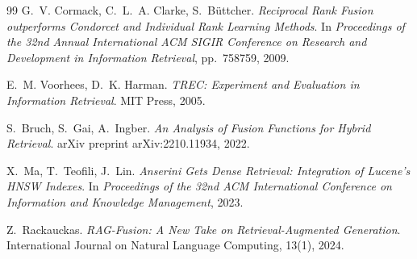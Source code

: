 \documentclass[runningheads,a4paper]{llncs}
\begin{document}
\begin{thebibliography}{99}
G.~V. Cormack, C.~L.~A. Clarke, S.~B{\"u}ttcher.
\newblock \textit{Reciprocal Rank Fusion outperforms Condorcet and Individual Rank Learning Methods}.
\newblock In \textit{Proceedings of the 32nd Annual International ACM SIGIR Conference on Research and Development in Information Retrieval}, pp.~758\textendash{}759, 2009.

E.~M. Voorhees, D.~K. Harman.
\newblock \textit{TREC: Experiment and Evaluation in Information Retrieval}.
\newblock MIT Press, 2005.

S.~Bruch, S.~Gai, A.~Ingber.
\newblock \textit{An Analysis of Fusion Functions for Hybrid Retrieval}.
\newblock arXiv preprint arXiv:2210.11934, 2022.

X.~Ma, T.~Teofili, J.~Lin.
\newblock \textit{Anserini Gets Dense Retrieval: Integration of Lucene's HNSW Indexes}.
\newblock In \textit{Proceedings of the 32nd ACM International Conference on Information and Knowledge Management}, 2023.

Z.~Rackauckas.
\newblock \textit{RAG-Fusion: A New Take on Retrieval-Augmented Generation}.
\newblock International Journal on Natural Language Computing, 13(1), 2024.

\end{thebibliography}
\end{document}
